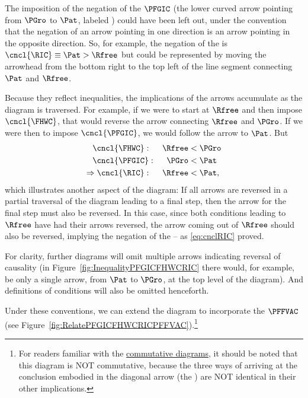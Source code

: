 \documentclass[\econtexRoot/BufferStockTheory]{subfiles}
\begin{document}
The imposition of the negation of the $\PFGIC$ (the lower curved arrow pointing from $\PGro$ to {$\Pat$}, labeled \cncl{\PFGIC}) could have been left out, under the convention that the negation of an arrow pointing in one direction is an arrow pointing in the opposite direction.  So, for example, the negation of the {\RIC} is $\cncl{\RIC} \equiv \Pat > \Rfree$ but could be represented by moving the arrowhead from the bottom right to the top left of the line segment connecting {$\Pat$} and $\Rfree$.

Because they reflect inequalities, the implications of the arrows accumulate as the diagram is traversed.  For example, if we were to start at $\Rfree$ and then impose $\cncl{\FHWC}$, that would reverse the arrow connecting $\Rfree$ and $\PGro$.  If we were then to impose $\cncl{\PFGIC}$, we would follow the arrow to {$\Pat$}.  But  
\begin{align}
  \cncl{\FHWC}:~~~~  \Rfree & < \PGro \notag  
  \\ \cncl{\PFGIC}:~~~~ \PGro & < \Pat %
                                \label{eq:cnclRIC}
  \\ \Rightarrow \cncl{\RIC}:~~~~\Rfree & < \Pat \notag,
\end{align}
which illustrates another aspect of the diagram: If all arrows are reversed in a partial traversal of the diagram leading to a final step, then the arrow for the final step must also be reversed.  In this case, since both conditions leading to $\Rfree$ have had their arrows reversed, the arrow coming out of $\Rfree$ should also be reversed, implying the negation of the {\RIC} -- as \eqref{eq:cnclRIC} proved.

For clarity, further diagrams will omit multiple arrows indicating reversal of causality (in Figure~\ref{fig:InequalityPFGICFHWCRIC} there would, for example, be only a single arrow, from {$\Pat$} to $\PGro$, at the top level of the diagram).  And definitions of conditions will also be omitted henceforth.

Under these conventions, we can extend the diagram to incorporate the $\PFFVAC$ (see Figure~\ref{fig:RelatePFGICFHWCRICPFFVAC}).\footnote{For readers familiar with the \href{https://en.wikipedia.org/wiki/Commutative_diagram}{commutative diagrams}, it should be noted that this diagram is NOT commutative, because the three ways of arriving at the conclusion embodied in the diagonal arrow (the {\PFFVAC}) are NOT identical in their other implications.}
\end{document}
